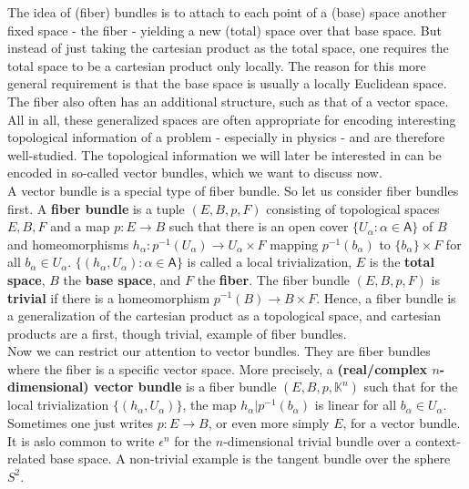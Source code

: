 \nocite{7fc005ba}
\nocite{c7f15065}
The idea of (fiber) bundles is to attach to each point of a (base) space another fixed space - the fiber - yielding a new (total) space over that base space.
But instead of just taking the cartesian product as the total space, one requires the total space to be a cartesian product only locally.
The reason for this more general requirement is that the base space is usually a locally Euclidean space.
The fiber also often has an additional structure, such as that of a vector space.
All in all, these generalized spaces are often appropriate for encoding interesting topological information of a problem - especially in physics - and are therefore well-studied.
The topological information we will later be interested in can be encoded in so-called vector bundles, which we want to discuss now.
\\
A vector bundle is a special type of fiber bundle.
So let us consider fiber bundles first.
A \textbf{fiber bundle} is a tuple $(E,B,p,F)$ consisting of topological spaces $E,B,F$ and a map $p \colon E \to B$ such that there is an open cover $\lbrace U_{\alpha} \colon \alpha \in \mathsf{A} \rbrace$ of $B$ and homeomorphisms $h_{\alpha} \colon p^{-1}(U_{\alpha}) \to U_{\alpha} \times F$ mapping $p^{-1}(b_{\alpha})$ to $\lbrace b_{\alpha} \rbrace \times F$ for all $b_{\alpha} \in U_{\alpha}$.
$\lbrace (h_{\alpha},U_{\alpha}) \colon \alpha \in \mathsf{A} \rbrace$ is called a local trivialization, $E$ is the \textbf{total space}, $B$ the \textbf{base space}, and $F$ the \textbf{fiber}.
The fiber bundle $(E,B,p,F)$ is \textbf{trivial} if there is a homeomorphism $p^{-1}(B) \to B \times F$.
Hence, a fiber bundle is a generalization of the cartesian product as a topological space, and cartesian products are a first, though trivial, example of fiber bundles.
\\
Now we can restrict our attention to vector bundles.
They are fiber bundles where the fiber is a specific vector space.
More precisely, a \textbf{(real/complex $n$-dimensional) vector bundle} is a fiber bundle $(E,B,p,\mathbb{K}^{n})$ such that for the local trivialization $\lbrace (h_{\alpha},U_{\alpha}) \rbrace$, the map $h_{\alpha} \vert p^{-1}(b_{\alpha})$ is linear for all $b_{\alpha} \in U_{\alpha}$.
Sometimes one just writes $p \colon E \to B$, or even more simply $E$, for a vector bundle.
It is aslo common to write $\epsilon^{n}$ for the $n$-dimensional trivial bundle over a context-related base space.
A non-trivial example is the tangent bundle over the sphere $S^{2}$.
\\
